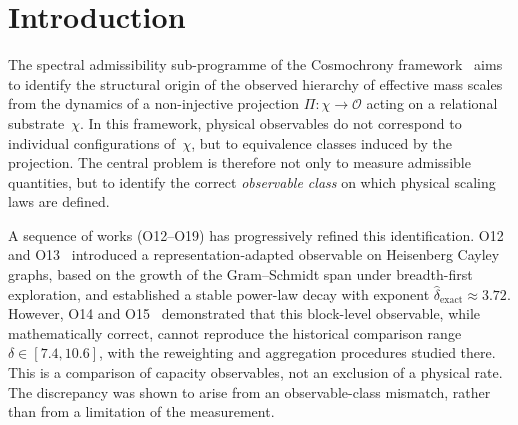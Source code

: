 \documentclass[11pt,a4paper]{article}
\theoremstyle{definition}
\theoremstyle{remark}
\begin{document}
  \clearpage
  \tableofcontents

\clearpage
  \section{Introduction}
    \label{sec:intro}

    The spectral admissibility sub-programme of the Cosmochrony
    framework~\cite{Cosmochrony} aims to identify the structural origin
    of the observed hierarchy of effective mass scales from the dynamics
    of a non-injective projection
    $\Pi : \chi \to \mathcal{O}$
    acting on a relational substrate~$\chi$.
    In this framework, physical observables do not correspond to
    individual configurations of~$\chi$, but to equivalence classes
    induced by the projection.
    The central problem is therefore not only to measure admissible
    quantities, but to identify the correct \emph{observable class}
    on which physical scaling laws are defined.

    A sequence of works (O12--O19) has progressively refined this
    identification.
    O12 and O13~\cite{Beau2026a16,Beau2026a17} introduced a
    representation-adapted observable on Heisenberg Cayley graphs, based
    on the growth of the Gram--Schmidt span under breadth-first
    exploration, and established a stable power-law decay with exponent
    $\hat{\delta}_{\mathrm{exact}} \approx 3.72$.
    However, O14 and O15~\cite{Beau2026a18,Beau2026a19} demonstrated
    that this block-level observable, while mathematically correct,
    cannot reproduce the historical comparison range
    $\delta \in [7.4, 10.6]$, with the reweighting and aggregation procedures studied there.
    This is a comparison of capacity observables, not an exclusion of a physical rate.
    The discrepancy was shown to arise from an observable-class mismatch,
    rather than from a limitation of the measurement.
\end{document}
